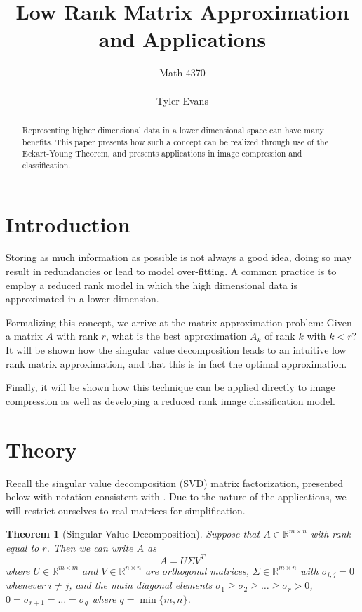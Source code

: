 \documentclass[a4paper]{article}
\title{Low Rank Matrix Approximation and Applications}
\author{Math 4370\\ \\ Tyler Evans}
\newtheorem{theorem}{Theorem}[section]
\begin{document}
\maketitle

\begin{abstract}
Representing higher dimensional data in a lower dimensional space can have many benefits.  This paper presents how such a concept can be realized through use of the Eckart-Young Theorem, and presents applications in image compression and classification.
\end{abstract}

\section{Introduction}

Storing as much information as possible is not always a good idea, doing so may result in redundancies or lead to model over-fitting.  A common practice is to employ a reduced rank model in which the high dimensional data is approximated in a lower dimension.

Formalizing this concept, we arrive at the matrix approximation problem: Given a matrix $A$ with rank $r$, what is the best approximation $A_k$ of rank $k$ with $k<r$?  It will be shown how the singular value decomposition leads to an intuitive low rank matrix approximation, and that this is in fact the optimal approximation.

Finally, it will be shown how this technique can be applied directly to image compression as well as developing a reduced rank image classification model.

\section{Theory}

Recall the singular value decomposition (SVD) matrix factorization, presented below with notation consistent with \cite{elden}.  Due to the nature of the applications, we will restrict ourselves to real matrices for simplification.

\begin{theorem}[Singular Value Decomposition]
Suppose that $A\in \mathbb{R}^{m\times n}$ with rank equal to $r$.  Then we can write $A$ as
\begin{equation}
A=U\Sigma V^T
\end{equation}
where $U\in \mathbb{R}^{m\times m}$ and $V\in \mathbb{R}^{n\times n}$ are orthogonal matrices, $\Sigma \in \mathbb{R}^{m\times n}$ with $\sigma_{i,j} = 0$ whenever $i\neq j$, and the main diagonal elements $\sigma_1 \geq \sigma_2 \geq \dots \geq \sigma_r > 0$, $0=\sigma_{r+1} = \dots = \sigma_q$ where $q=\min\{m,n\}$.
\end{theorem}
\end{document}
